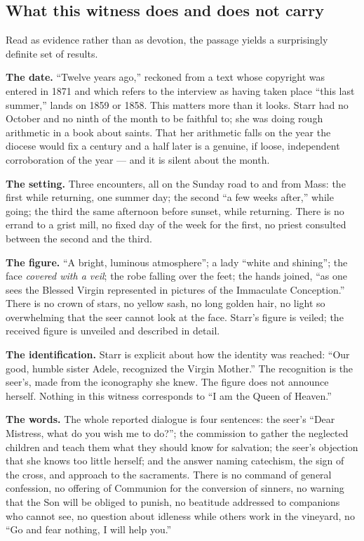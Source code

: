\subsection{What this witness does and does not carry}

Read as evidence rather than as devotion, the passage yields a
surprisingly definite set of results.

\textbf{The date.} ``Twelve years ago,'' reckoned from a text whose
copyright was entered in 1871 and which refers to the interview as
having taken place ``this last summer,'' lands on 1859 or 1858. This
matters more than it looks. Starr had no October and no ninth of the
month to be faithful to; she was doing rough arithmetic in a book about
saints. That her arithmetic falls on the year the diocese would fix a
century and a half later is a genuine, if loose, independent
corroboration of the year --- and it is silent about the month.

\textbf{The setting.} Three encounters, all on the Sunday road to and
from Mass: the first while returning, one summer day; the second ``a
few weeks after,'' while going; the third the same afternoon before
sunset, while returning. There is no errand to a grist mill, no fixed
day of the week for the first, no priest consulted between the second
and the third.

\textbf{The figure.} ``A bright, luminous atmosphere''; a lady ``white
and shining''; the face \emph{covered with a veil}; the robe falling
over the feet; the hands joined, ``as one sees the Blessed Virgin
represented in pictures of the Immaculate Conception.'' There is no
crown of stars, no yellow sash, no long golden hair, no light so
overwhelming that the seer cannot look at the face. Starr's figure is
veiled; the received figure is unveiled and described in detail.

\textbf{The identification.} Starr is explicit about how the identity
was reached: ``Our good, humble sister Adele, recognized the Virgin
Mother.'' The recognition is the seer's, made from the iconography she
knew. The figure does not announce herself. Nothing in this witness
corresponds to ``I am the Queen of Heaven.''

\textbf{The words.} The whole reported dialogue is four sentences: the
seer's ``Dear Mistress, what do you wish me to do?''; the commission to
gather the neglected children and teach them what they should know for
salvation; the seer's objection that she knows too little herself; and
the answer naming catechism, the sign of the cross, and approach to the
sacraments. There is no command of general confession, no offering of
Communion for the conversion of sinners, no warning that the Son will
be obliged to punish, no beatitude addressed to companions who cannot
see, no question about idleness while others work in the vineyard, no
``Go and fear nothing, I will help you.''

